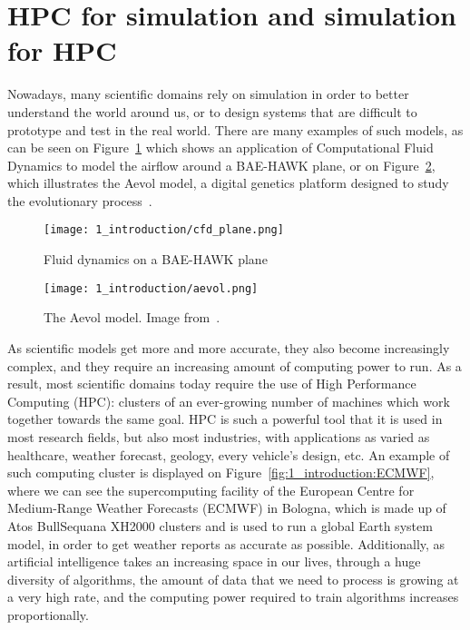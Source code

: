 \section{HPC for simulation and simulation for HPC}

Nowadays, many scientific domains rely on simulation in order to better
understand the world around us, or to design systems that are difficult to
prototype and test in the real world. There are many examples of such models, as
can be seen on Figure~\ref{fig:1_introduction:plane} which shows an application
of Computational Fluid Dynamics to model the airflow around a BAE-HAWK plane, or
on Figure~\ref{fig:1_introduction:aevol}, which illustrates the Aevol model, a
digital genetics platform designed to study the evolutionary
process~\cite{aevol}.

\begin{figure}[!ht]
    \centering
    \texttt{[image: 1\_introduction/cfd\_plane.png]}
    \caption[Fluid dynamic on a BAE-HAWK plane]{Fluid dynamics on a BAE-HAWK plane\protect\footnotemark}
    \label{fig:1_introduction:plane}
\end{figure}


\begin{figure}[!ht]
    \centering
    \texttt{[image: 1\_introduction/aevol.png]}
    \caption[The Aevol model]{The Aevol model. Image from~\cite{aevol}.}
    \label{fig:1_introduction:aevol}
\end{figure}

As scientific models get more and more accurate, they also become increasingly
complex, and they require an increasing amount of computing power to run. As a
result, most scientific domains today require the use of High Performance
Computing (HPC): clusters of an ever-growing number of machines which work
together towards the same goal. HPC is such a powerful tool that it is used in
most research fields, but also most industries, with applications as varied as
healthcare, weather forecast, geology, every vehicle's design, etc. An example
of such computing cluster is displayed on Figure~\ref{fig:1_introduction:ECMWF},
where we can see the supercomputing facility of the European Centre for
Medium-Range Weather Forecasts (ECMWF) in Bologna, which is made up of Atos
BullSequana XH2000 clusters and is used to run a global Earth system model, in
order to get weather reports as accurate as possible. Additionally, as
artificial intelligence takes an increasing space in our lives, through a huge
diversity of algorithms, the amount of data that we need to process is growing
at a very high rate, and the computing power required to train algorithms
increases proportionally.

